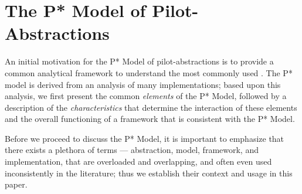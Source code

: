 \documentclass[conference]{IEEEtran}
\begin{document}





\section{The P* Model of Pilot-\\Abstractions}
\label{sec:pilot-model}

An initial motivation for the P* Model of pilot-abstractions is to
provide a common analytical framework to understand the most commonly
used \pilotjobs.  The P* model is derived from an analysis of many
\pilotjob implementations; based upon this analysis, we first present
the common {\it elements} of the P* Model, followed by a description
of the {\it characteristics} that determine the interaction of these
elements and the overall functioning of a \pilotjob framework that is
consistent with the P* Model.  

Before we proceed to discuss the P* Model, it is important to
emphasize that there exists a plethora of terms --- abstraction,
model, framework, and implementation, that are overloaded and
overlapping, and often even used inconsistently in the literature;
thus we establish their context and usage in this paper.
\end{document}
